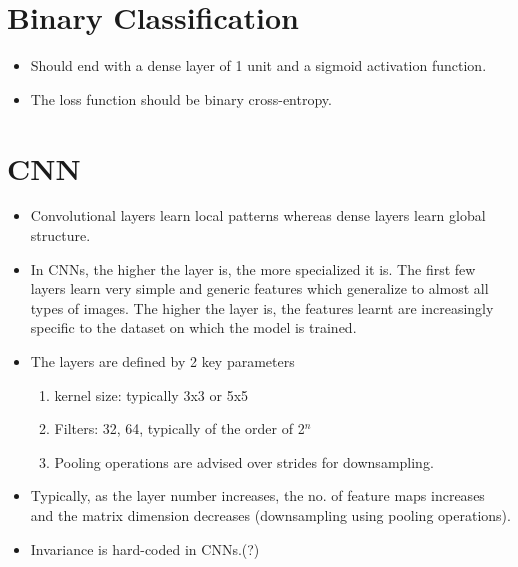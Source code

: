 \documentclass[a4paper, 12pt]{report}
\begin{document}
\section{Binary Classification}
\begin{itemize}
\item Should end with a dense layer of 1 unit and a sigmoid activation function.
\item The loss function should be binary cross-entropy.
\end{itemize}


\section{CNN}
\label{sec:cnn}
\begin{itemize}
\item Convolutional layers learn local patterns whereas dense layers learn global structure.
\item In CNNs, the higher the layer is, the more specialized it is. The first few layers learn very simple and generic features which generalize to almost all types of images. The higher the layer is, the features learnt are increasingly specific to the dataset on which the model is trained.
\item The layers are defined by 2 key parameters
	\begin{enumerate}
	\item kernel size: typically 3x3 or 5x5
	\item Filters: 32, 64, typically of the order of 2$^{n}$
	\item Pooling operations are advised over strides for downsampling.
	\end{enumerate}
\item Typically, as the layer number increases, the no. of feature maps increases and the matrix dimension decreases (downsampling using pooling operations).
\item {\color{red}Invariance is hard-coded in CNNs.(?)}
\end{itemize}
\end{document}
